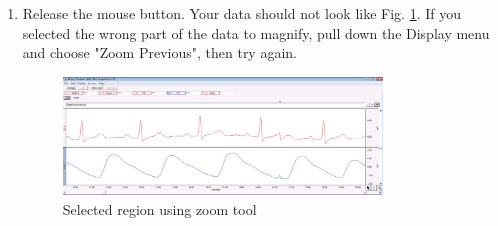 \documentclass{article}
\begin{document}
\begin{enumerate}
	\item Release the mouse button. Your data should not look like Fig. \ref{selected_cycles}. If you selected the wrong part of the data to magnify, pull down the Display menu and choose "Zoom Previous", then try again.
	
		\begin{figure}[h]
		\includegraphics[width=0.8\textwidth]{../images/BIOPAC_10.jpg}
		\centering
		\caption{Selected region using zoom tool}
		\label{selected_cycles}
		\end{figure}	
\end{enumerate}
\end{document}
